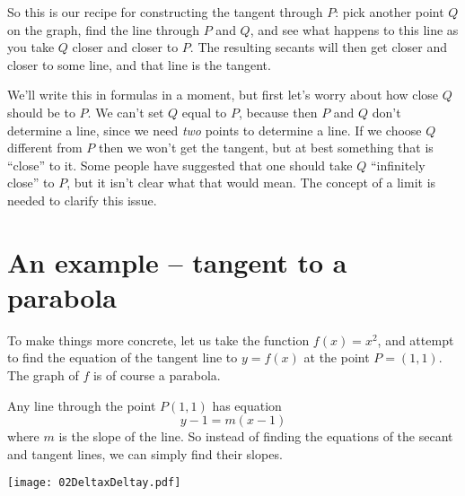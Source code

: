 So this is our recipe for constructing the tangent through $P$: pick another
point $Q$ on the graph, find the line through $P$ and $Q$, and see what happens
to this line as you take $Q$ closer and closer to $P$.  The resulting secants
will then get closer and closer to some line, and that line is the tangent.

We'll write this in formulas in a moment, but first let's worry about
how close $Q$ should be to $P$.  We can't set $Q$ equal to $P$,
because then $P$ and $Q$ don't determine a line, since we need \emph{two}
points to determine a line.  If we choose $Q$ different from $P$
then we won't get the tangent, but at best something that is
``close'' to it.  Some people have suggested that one should take $Q$
``infinitely close'' to $P$, but it isn't clear what that would mean.
The concept of a limit is needed to clarify this issue.

\section{An example -- tangent to a parabola} 
\label{sec:tangent-to-parabola}
To make things more concrete, let us take the function $f(x)=x^2$, and attempt
to find the equation of the tangent line to $y=f(x)$ at the point $P=(1, 1)$.
The graph of $f$ is of course a parabola.

Any line through the point $P(1,1)$ has equation
\[
y-1 = m(x-1)
\]
where $m$ is the slope of the line.  So instead of finding the equations of the
secant and tangent lines, we can simply find their slopes.

\begin{center}
  \texttt{[image: 02DeltaxDeltay.pdf]}
\end{center}

